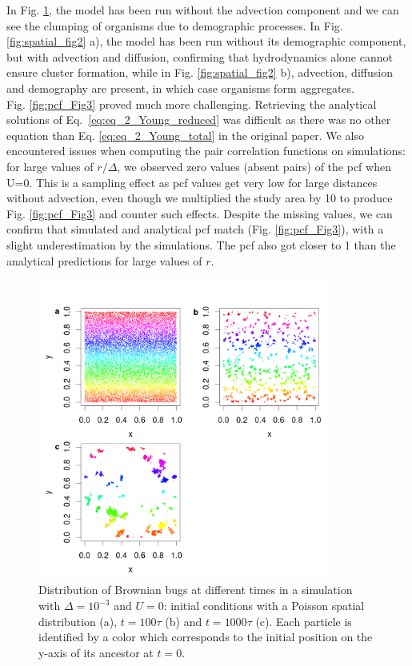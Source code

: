 In Fig. \ref{fig:spatial_fig1}, the model has been run without the advection component and we can see the clumping of organisms due to demographic processes. In Fig. \ref{fig:spatial_fig2} a), the model has been run without its demographic component, but with advection and diffusion, confirming that hydrodynamics alone cannot ensure cluster formation, while in Fig.  \ref{fig:spatial_fig2} b), advection, diffusion and demography are present, in which case organisms form aggregates.\\
  
Fig. \ref{fig:pcf_Fig3} proved much more challenging. Retrieving the analytical solutions of Eq.~\ref{eq:eq_2_Young_reduced} was difficult as there was no other equation than Eq. \ref{eq:eq_2_Young_total} in the original paper. We also encountered issues when computing the pair correlation functions on simulations: for large values of $r/\Delta$, we observed zero values (absent pairs) of the pcf when U=0. This is a sampling effect as pcf values get very low for large distances without advection, even though we multiplied the study area by 10 to produce Fig.  \ref{fig:pcf_Fig3} and counter such effects. Despite the missing values, we can confirm that simulated and analytical pcf match (Fig. \ref{fig:pcf_Fig3}), with a slight underestimation by the simulations. The pcf also got closer to 1 than the analytical predictions for large values of $r$. %

\begin{figure}[H]
\begin{center} 
 \includegraphics[width=0.86\textwidth]{../code/figure/spatial_distribution_Fig1.png}
  \caption{Distribution of Brownian bugs at different times in a simulation with $\Delta=10^{-3}$ and $U=0$: initial conditions with a Poisson spatial distribution (a), $t=100\tau$ (b) and $t=1000\tau$ (c). Each particle is identified by a color which corresponds to the initial position on the y-axis of its ancestor at $t=0$.}
  \label{fig:spatial_fig1}
\end{center}
  \end{figure}

